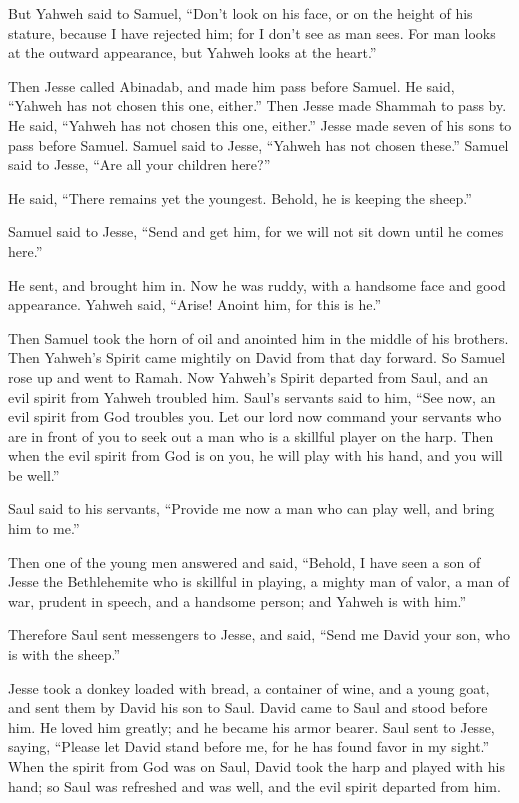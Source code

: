 \begin{paracol}{2}
\begin{otherlanguage}{english}
 But Yahweh said to Samuel, ``Don't look on his face, or
on the height of his stature, because I have rejected him; for I don't
see as man sees. For man looks at the outward appearance, but Yahweh
looks at the heart.''

 Then Jesse called Abinadab, and made him pass before
Samuel. He said, ``Yahweh has not chosen this one, either.''
 Then Jesse made Shammah to pass by. He said, ``Yahweh has
not chosen this one, either.''  Jesse made seven of his
sons to pass before Samuel. Samuel said to Jesse, ``Yahweh has not
chosen these.''  Samuel said to Jesse, ``Are all your
children here?''

He said, ``There remains yet the youngest. Behold, he is keeping the
sheep.''

Samuel said to Jesse, ``Send and get him, for we will not sit down until
he comes here.''

 He sent, and brought him in. Now he was ruddy, with a
handsome face and good appearance. Yahweh said, ``Arise! Anoint him, for
this is he.''

 Then Samuel took the horn of oil and anointed him in the
middle of his brothers. Then Yahweh's Spirit came mightily on David from
that day forward. So Samuel rose up and went to Ramah. 
Now Yahweh's Spirit departed from Saul, and an evil spirit from Yahweh
troubled him.  Saul's servants said to him, ``See now, an
evil spirit from God troubles you.  Let our lord now
command your servants who are in front of you to seek out a man who is a
skillful player on the harp. Then when the evil spirit from God is on
you, he will play with his hand, and you will be well.''

 Saul said to his servants, ``Provide me now a man who
can play well, and bring him to me.''

 Then one of the young men answered and said, ``Behold, I
have seen a son of Jesse the Bethlehemite who is skillful in playing, a
mighty man of valor, a man of war, prudent in speech, and a handsome
person; and Yahweh is with him.''

 Therefore Saul sent messengers to Jesse, and said,
``Send me David your son, who is with the sheep.''

 Jesse took a donkey loaded with bread, a container of
wine, and a young goat, and sent them by David his son to Saul.
 David came to Saul and stood before him. He loved him
greatly; and he became his armor bearer.  Saul sent to
Jesse, saying, ``Please let David stand before me, for he has found
favor in my sight.''  When the spirit from God was on
Saul, David took the harp and played with his hand; so Saul was
refreshed and was well, and the evil spirit departed from him.


\end{otherlanguage}
\end{paracol}
